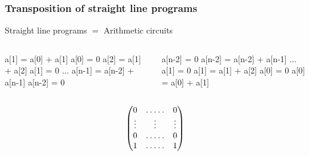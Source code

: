 \documentclass[10pt,usepdftitle=false]{beamer}
\begin{document}
\begin{frame}[fragile]
  \frametitle{Transposition of straight line programs}

  \begin{center}
    \large
    Straight line programs $=$ Arithmetic circuits
  \end{center}

  \begin{columns}
    \begin{column}{0.5\textwidth}
      \begin{center}
        \begin{minipage}{0.7\textwidth}
\begin{semiverbatim}
  a[1] = a[0] + a[1]
  a[0] = 0
  a[2] = a[1] + a[2]
  a[1] = 0
  ...
  a[n-1] = a[n-2] + a[n-1]
  a[n-2] = 0
\end{semiverbatim}
        \end{minipage}
      \end{center}
    \end{column}

    \begin{column}{0.5\textwidth}
      \begin{center}
        \begin{minipage}{0.7\textwidth}
\begin{semiverbatim}
  a[n-2] = 0
  a[n-2] = a[n-2] + a[n-1]
  ...
  a[1] = 0
  a[1] = a[1] + a[2]
  a[0] = 0
  a[0] = a[0] + a[1]
\end{semiverbatim}
        \end{minipage}
      \end{center}
    \end{column}
    \end{columns}
  
  \vfill

  \begin{columns}
    \begin{column}{0.5\textwidth}
      \begin{equation*}
        \begin{pmatrix}
          0 & \hdotsfor{3} & 0\\
          \vdots  &  &\vdots&& \vdots \\
          0 & \hdotsfor{3} & 0\\
          1 & \hdotsfor{3} & 1
        \end{pmatrix}
      \end{equation*}
    \end{column}


\end{columns}
\end{frame}
\end{document}
